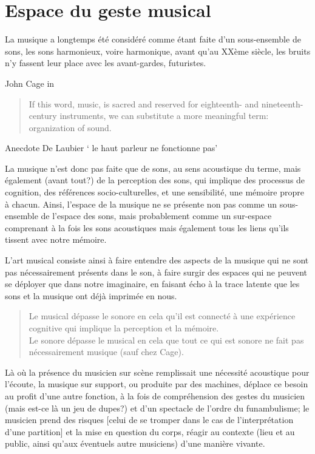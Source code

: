 \section*{Espace du geste musical}
La musique a longtemps été considéré comme étant faite d'un sous-ensemble de sons, les sons harmonieux, voire harmonique, avant qu'au XXème siècle, les bruits n'y fassent leur place avec les avant-gardes, futuristes. 

John Cage in \cite{cage_silence:_1961}
\begin{quotation}
\noindent If this word, music, is sacred and reserved for eighteenth- and nineteenth-century instruments, we can substitute a more meaningful term: organization of sound.\\
\end{quotation}


Anecdote De Laubier ` le haut parleur ne fonctionne pas'

La musique n'est donc pas faite que de sons, au sens acoustique du terme, mais également (avant tout?) de la perception des sons, qui implique des processus de cognition, des références socio-culturelles, et une sensibilité, une mémoire propre à chacun. 
Ainsi, l'espace de la musique ne se présente non pas comme un sous-ensemble de l'espace des sons, mais probablement comme un sur-espace comprenant à la fois les sons acoustiques mais également tous les liens qu'ils tissent avec notre mémoire.


L'art musical consiste ainsi à faire entendre des aspects de la musique qui ne sont pas nécessairement présents dans le son, à faire surgir des espaces qui ne peuvent se déployer que dans notre imaginaire, en faisant écho à la trace latente que les sons et la musique ont déjà imprimée en nous.


\begin{quotation}
\noindent Le musical dépasse le sonore en cela qu’il est connecté à une expérience cognitive qui implique la perception et la mémoire.\\
Le sonore dépasse le musical en cela que tout ce qui est sonore ne fait pas nécessairement musique (sauf chez Cage).
\end{quotation}


Là où la présence du musicien sur scène remplissait une nécessité acoustique pour l’écoute, la musique sur support, ou produite par des machines, déplace ce besoin au profit d’une autre fonction, à la fois de compréhension des gestes du musicien (mais est-ce là un jeu de dupes?) et d’un spectacle de l’ordre du funambulisme; le musicien prend des risques [celui de se tromper dans le cas de l’interprétation d’une partition] et la mise en question du corps, réagir au contexte (lieu et au public, ainsi qu’aux éventuels autre musiciens) d’une manière vivante.

